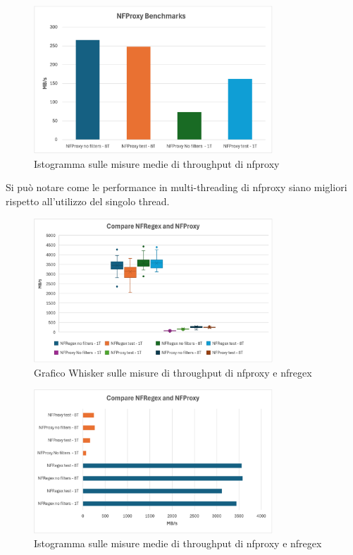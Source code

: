 \begin{figure}[H]
    \centering
    \includegraphics[width=0.8\textwidth]{images/chapter4/istogramma_nfproxy.png}
    \caption{Istogramma sulle misure medie di throughput di nfproxy}
    \label{fig:istogramma_nfproxy}
\end{figure}

Si può notare come le performance in multi-threading di nfproxy siano migliori rispetto all'utilizzo del singolo thread.

\begin{figure}[H]
    \centering
    \includegraphics[width=0.8\textwidth]{images/chapter4/whisker_compare.png}
    \caption{Grafico Whisker sulle misure di throughput di nfproxy e nfregex}
    \label{fig:wisker_nfproxy_nfregex}
\end{figure}

\begin{figure}[H]
    \centering
    \includegraphics[width=0.8\textwidth]{images/chapter4/istrogramma_compare.png}
    \caption{Istogramma sulle misure medie di throughput di nfproxy e nfregex}
    \label{fig:istogramma_nfproxy_nfregex}
\end{figure}

